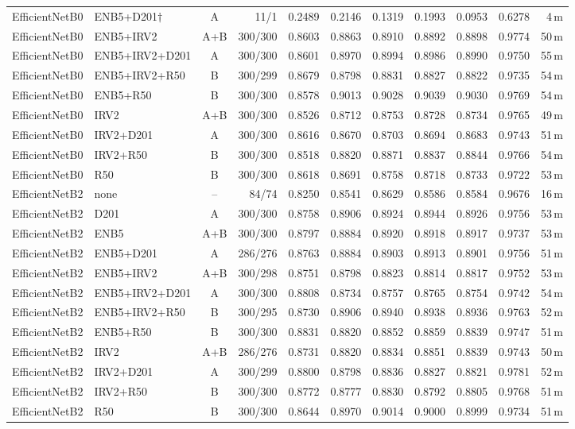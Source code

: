 \documentclass[10pt,letterpaper]{article}
\begin{document}
\begin{table}[H]
\begin{tabular}{@{}llcrrrrrrrr@{}}
EfficientNetB0 & ENB5+D201$\dagger$ & A & 11/1 & 0.2489 & 0.2146 & 0.1319 & 0.1993 & 0.0953 & 0.6278 & 4\,m \\
EfficientNetB0 & ENB5+IRV2 & A+B & 300/300 & 0.8603 & 0.8863 & 0.8910 & 0.8892 & 0.8898 & 0.9774 & 50\,m \\
EfficientNetB0 & ENB5+IRV2+D201 & A & 300/300 & 0.8601 & 0.8970 & 0.8994 & 0.8986 & 0.8990 & 0.9750 & 55\,m \\
EfficientNetB0 & ENB5+IRV2+R50 & B & 300/299 & 0.8679 & 0.8798 & 0.8831 & 0.8827 & 0.8822 & 0.9735 & 54\,m \\
EfficientNetB0 & ENB5+R50 & B & 300/300 & 0.8578 & 0.9013 & 0.9028 & 0.9039 & 0.9030 & 0.9769 & 54\,m \\
EfficientNetB0 & IRV2 & A+B & 300/300 & 0.8526 & 0.8712 & 0.8753 & 0.8728 & 0.8734 & 0.9765 & 49\,m \\
EfficientNetB0 & IRV2+D201 & A & 300/300 & 0.8616 & 0.8670 & 0.8703 & 0.8694 & 0.8683 & 0.9743 & 51\,m \\
EfficientNetB0 & IRV2+R50 & B & 300/300 & 0.8518 & 0.8820 & 0.8871 & 0.8837 & 0.8844 & 0.9766 & 54\,m \\
EfficientNetB0 & R50 & B & 300/300 & 0.8618 & 0.8691 & 0.8758 & 0.8718 & 0.8733 & 0.9722 & 53\,m \\
\midrule
EfficientNetB2 & none & -- & 84/74 & 0.8250 & 0.8541 & 0.8629 & 0.8586 & 0.8584 & 0.9676 & 16\,m \\
EfficientNetB2 & D201 & A & 300/300 & 0.8758 & 0.8906 & 0.8924 & 0.8944 & 0.8926 & 0.9756 & 53\,m \\
EfficientNetB2 & ENB5 & A+B & 300/300 & 0.8797 & 0.8884 & 0.8920 & 0.8918 & 0.8917 & 0.9737 & 53\,m \\
EfficientNetB2 & ENB5+D201 & A & 286/276 & 0.8763 & 0.8884 & 0.8903 & 0.8913 & 0.8901 & 0.9756 & 51\,m \\
EfficientNetB2 & ENB5+IRV2 & A+B & 300/298 & 0.8751 & 0.8798 & 0.8823 & 0.8814 & 0.8817 & 0.9752 & 53\,m \\
EfficientNetB2 & ENB5+IRV2+D201 & A & 300/300 & 0.8808 & 0.8734 & 0.8757 & 0.8765 & 0.8754 & 0.9742 & 54\,m \\
EfficientNetB2 & ENB5+IRV2+R50 & B & 300/295 & 0.8730 & 0.8906 & 0.8940 & 0.8938 & 0.8936 & 0.9763 & 52\,m \\
EfficientNetB2 & ENB5+R50 & B & 300/300 & 0.8831 & 0.8820 & 0.8852 & 0.8859 & 0.8839 & 0.9747 & 51\,m \\
EfficientNetB2 & IRV2 & A+B & 286/276 & 0.8731 & 0.8820 & 0.8834 & 0.8851 & 0.8839 & 0.9743 & 50\,m \\
EfficientNetB2 & IRV2+D201 & A & 300/299 & 0.8800 & 0.8798 & 0.8836 & 0.8827 & 0.8821 & 0.9781 & 52\,m \\
EfficientNetB2 & IRV2+R50 & B & 300/300 & 0.8772 & 0.8777 & 0.8830 & 0.8792 & 0.8805 & 0.9768 & 51\,m \\
EfficientNetB2 & R50 & B & 300/300 & 0.8644 & 0.8970 & 0.9014 & 0.9000 & 0.8999 & 0.9734 & 51\,m \\
\bottomrule
\end{tabular}
\end{table}
\FloatBarrier
\end{document}
